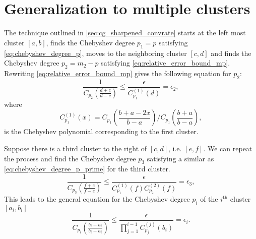 \section{Generalization to multiple clusters}\label{sec:multiple_clusters}
The technique outlined in \cref{sec:cg_sharpened_convrate} starts at the left most cluster $[a,b]$, finds the Chebyshev degree $p_1=p$ satisfying \cref{eq:chebyshev_degree_p}, moves to the neighboring cluster $[c,d]$ and finds the Chebyshev degree $p_2 = m_2 - p$ satisfying \cref{eq:relative_error_bound_mp}. Rewriting \cref{eq:relative_error_bound_mp} gives the following equation for $p_2$:
\begin{equation}
    \frac{1}{C_{p_2}\left(\frac{d+c}{d-c}\right)} \leq \frac{\epsilon}{{C}^{(1)}_{p_1}(d)} = \epsilon_2,
    \label{eq:chebyshev_degree_p_prime}
\end{equation}
where
\[
    C^{(1)}_{p_1}(x) = C_{p_1}\left(\frac{b + a - 2x}{b - a}\right) /C_{p_1}\left(\frac{b+a}{b-a}\right),
\]
is the Chebyshev polynomial corresponding to the first cluster.

Suppose there is a third cluster to the right of $[c,d]$, i.e. $[e,f]$. We can repeat the process and find the Chebyshev degree $p_3$ satisfying a similar as \cref{eq:chebyshev_degree_p_prime} for the third cluster. 
\[
    \frac{1}{C_{p_3}\left(\frac{f+e}{f-e}\right)} \leq \frac{\epsilon}{C^{(1)}_{p_1}(f)C^{(2)}_{p_2}(f)} = \epsilon_3,
\]
This leads to the general equation for the Chebyshev degree $p_i$ of the $i^{\text{th}}$ cluster $[a_i, b_i]$
\begin{equation}
    \frac{1}{C_{p_i}\left(\frac{b_i + a_i}{b_i - a_i}\right)} \leq \frac{\epsilon}{\prod_{j=1}^{i-1} C^{(j)}_{p_j}(b_i)} = \epsilon_i.
    \label{eq:chebyshev_degree_p_i}
\end{equation}

